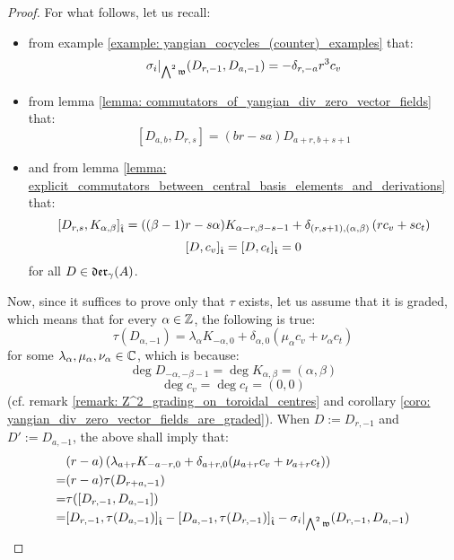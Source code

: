\begin{proof}
                For what follows, let us recall:
                \begin{itemize}
                    \item from example \ref{example: yangian_cocycles_(counter)_examples} that:
                        $$\sigma_i|_{ \bigwedge^2 \frakw }(D_{r, -1}, D_{a, -1}) = -\delta_{r, -a} r^3 c_v$$
                    \item from lemma \ref{lemma: commutators_of_yangian_div_zero_vector_fields} that:
                        $$[D_{a, b}, D_{r, s}] = (br - sa) D_{a + r, b + s + 1}$$
                    \item and from lemma \ref{lemma: explicit_commutators_between_central_basis_elements_and_derivations} that:
                        $$[D_{r, s}, K_{\alpha, \beta}]_{\extendedtoroidal} = ((\beta - 1)r - s\alpha) K_{\alpha - r, \beta - s - 1} + \delta_{(r, s + 1), (\alpha, \beta)} \left( r c_v + s c_t \right)$$
                        $$[D, c_v]_{\extendedtoroidal} = [D, c_t]_{\extendedtoroidal} = 0$$
                    for all $D \in \divzero$.
                \end{itemize}
                Now, since it suffices to prove only that $\tau$ exists, let us assume that it is graded, which means that for every $\alpha \in \Z$, the following is true:
                    $$\tau(D_{\alpha, -1}) = \lambda_{\alpha} K_{-\alpha, 0} + \delta_{\alpha, 0}( \mu_{\alpha} c_v + \nu_{\alpha} c_t )$$
                for some $\lambda_{\alpha}, \mu_{\alpha}, \nu_{\alpha} \in \bbC$, which is because:
                    $$\deg D_{-\alpha, -\beta - 1} = \deg K_{\alpha, \beta} = (\alpha, \beta)$$
                    $$\deg c_v = \deg c_t = (0, 0)$$
                (cf. remark \ref{remark: Z^2_grading_on_toroidal_centres} and corollary \ref{coro: yangian_div_zero_vector_fields_are_graded}). When $D := D_{r, -1}$ and $D' := D_{a, -1}$, the above shall imply that:
                    $$
                        \begin{aligned}
                            & (r - a) \left( \lambda_{a + r} K_{-a - r, 0} + \delta_{a + r, 0}( \mu_{a + r} c_v + \nu_{a + r} c_t ) \right)
                            \\
                            = & (r - a) \tau( D_{r + a, -1} )
                            \\
                            = & \tau( [D_{r, -1}, D_{a, -1}] )
                            \\
                            = & [ D_{r, -1}, \tau(D_{a, -1}) ]_{\extendedtoroidal} - [ D_{a, -1}, \tau(D_{r, -1}) ]_{\extendedtoroidal} - \sigma_i|_{\bigwedge^2 \frakw}(D_{r, -1}, D_{a, -1})

\end{aligned}$$
\end{proof}
